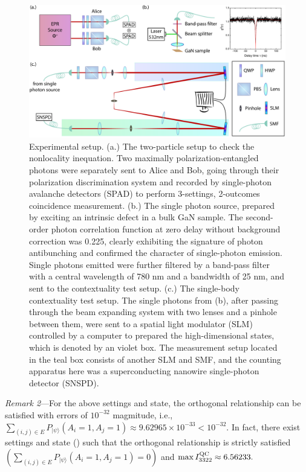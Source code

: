 \documentclass[pra,letterpaper,english,preprint,nofootinbib,aps,superscriptaddress,showkeys]{revtex4-1}
\theoremstyle{definition}
\theoremstyle{remark}
\newcommand{\add}[1]{\textcolor{zhliu}{#1}}
\newcommand\delete{\bgroup\markoverwith{\textcolor{zhliu}{\rule[0.5ex]{2pt}{0.8pt}}}\ULon}
\newcommand{\replace}[2]{\delete{#1}\add{#2}}
\newcommand{\add}[1]{#1}
\newcommand{\delete}[1]{\ignorespaces}
\newcommand{\replace}[2]{#2}
\begin{document}
\begin{figure}[htbp]
    \centering
    \includegraphics[width = .97\textwidth]{fig/exp-sch-draft-v2.pdf}
    \caption{Experimental setup.
    (a.) The two-particle setup to check the nonlocality inequation. Two maximally polarization-entangled photons were separately sent to Alice and Bob, going through their polarization discrimination system and recorded by single-photon avalanche detectors (SPAD) to perform 3-settings, 2-outcomes coincidence measurement.
    (b.) The single photon source, prepared by exciting an intrinsic defect in a bulk GaN sample. The second-order photon correlation function at zero delay without background correction was 0.225, clearly exhibiting the signature of photon antibunching and confirmed the character of single-photon emission. Single photons emitted were further filtered by a band-pass filter with a central wavelength of 780 nm and a bandwidth of 25 nm, and sent to the contextuality test setup.
    (c.) The single-body contextuality test setup.
    The single photons from (b), after passing through the beam expanding system with two lenses and a pinhole between them, were sent to a spatial light modulator (SLM) controlled by a computer to prepared the high-dimensional states, which is denoted by an violet box. The measurement setup located in the teal box consists of another SLM and SMF, and the counting apparatus here was a superconducting nanowire single-photon detector (SNSPD).}
    \label{fig:exp-sch}
 \end{figure}

\emph{Remark 2}---For the above settings and state, the orthogonal relationship can be satisfied with errors \replace{$10^{-32}$}{of $10^{-32}$ magmitude}, i.e.,
$\sum_{(i,j)\in E}P_{|\psi\rangle}(A_i=1,A_j=1)\approx 9.62965\times 10^{-33}<10^{-32}.$
In fact, there exist settings and state (\cite{SM}) such that the orthogonal relationship is strictly satisfied  $(\sum_{(i,j)\in E}P_{|\psi\rangle}(A_i=1,A_j=1)=0)$ and $\max I_{3322}^{\rm QC}\approx 6.56233.$ 
\end{document}
